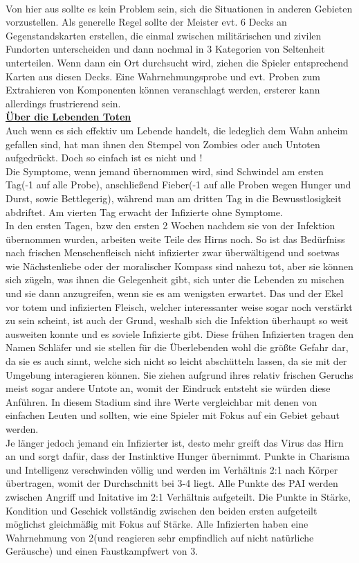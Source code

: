 \documentclass[twoside,a4paper]{minimal}
\begin{document}
\begin{multicols*}{3}
\\Von hier aus sollte es kein Problem sein, sich die Situationen in anderen Gebieten vorzustellen. Als generelle Regel sollte der Meister evt. 6 Decks an Gegenstandskarten erstellen, die einmal zwischen militärischen und zivilen Fundorten unterscheiden und dann nochmal in 3 Kategorien von Seltenheit unterteilen. Wenn dann ein Ort durchsucht wird, ziehen die Spieler entsprechend Karten aus diesen Decks. Eine Wahrnehmungsprobe und evt. Proben zum Extrahieren von Komponenten können veranschlagt werden, ersterer kann allerdings frustrierend sein.
\textbf{\uline{\\Über die Lebenden Toten}}
\\Auch wenn es sich effektiv um Lebende handelt, die ledeglich dem Wahn anheim gefallen sind, hat man ihnen den Stempel von Zombies oder auch Untoten aufgedrückt. Doch so einfach ist es nicht und !
\\Die Symptome, wenn jemand übernommen wird, sind Schwindel am ersten Tag(-1 auf alle Probe), anschließend Fieber(-1 auf alle Proben wegen Hunger und Durst, sowie Bettlegerig), während man am dritten Tag in die Bewusstlosigkeit abdriftet. Am vierten Tag erwacht der Infizierte ohne Symptome.
\\In den ersten Tagen, bzw den ersten 2 Wochen nachdem sie von der Infektion übernommen wurden, arbeiten weite Teile des Hirns noch. So ist das Bedürfniss nach frischen Menschenfleisch nicht infizierter zwar überwältigend und soetwas wie Nächstenliebe oder der moralischer Kompass sind nahezu tot, aber sie können sich zügeln, was ihnen die Gelegenheit gibt, sich unter die Lebenden zu mischen und sie dann anzugreifen, wenn sie es am wenigsten erwartet. Das und der Ekel vor totem und infizierten Fleisch, welcher interessanter weise sogar noch verstärkt zu sein scheint, ist auch der Grund, weshalb sich die Infektion überhaupt so weit ausweiten konnte und es soviele Infizierte gibt. Diese frühen Infizierten tragen den Namen Schläfer und sie stellen für die Überlebenden wohl die größte Gefahr dar, da sie es auch sinnt, welche sich nicht so leicht abschütteln lassen, da sie mit der Umgebung interagieren können. Sie ziehen aufgrund ihres relativ frischen Geruchs meist sogar andere Untote an, womit der Eindruck entsteht sie würden diese Anführen. In diesem Stadium sind ihre Werte vergleichbar mit denen von einfachen Leuten und sollten, wie eine Spieler mit Fokus auf ein Gebiet gebaut werden.
\\Je länger jedoch jemand ein Infizierter ist, desto mehr greift das Virus das Hirn an und sorgt dafür, dass der Instinktive Hunger übernimmt. Punkte in Charisma und Intelligenz verschwinden völlig und werden im Verhältnis 2:1 nach Körper übertragen, womit der Durchschnitt bei 3-4 liegt. Alle Punkte des PAI werden zwischen Angriff und Initative im 2:1 Verhältnis aufgeteilt. Die Punkte in Stärke, Kondition und Geschick vollständig zwischen den beiden ersten aufgeteilt möglichst gleichmäßig mit Fokus auf Stärke. Alle Infizierten haben eine Wahrnehmung von 2(und reagieren sehr empfindlich auf nicht natürliche Geräusche) und einen Faustkampfwert von 3.

\end{multicols*}
\end{document}
